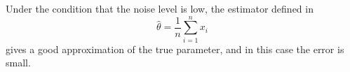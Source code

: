 Under the condition that the noise level is low, the estimator defined in
\begin{equation}
\hat{\theta} = \frac{1}{n}\sum_{i=1}^{n} x_i
\end{equation}
gives a good approximation of the true parameter, and in this case the error is small.
